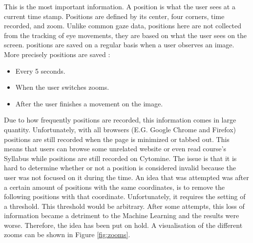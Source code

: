\documentclass[a4paper,11pt]{report}
\numberwithin{figure}{chapter} %
\begin{document}
\begin{itemize}
         This is the most important information.
         A position is what the user sees at a current time stamp.
         Positions are defined by its center, four corners, time recorded, and zoom.
         Unlike common gaze data, positions here are not collected from the tracking of eye movements, they are based on what the user sees on the screen.
         positions are saved on a regular basis when a user observes an image.
         More precisely positions are saved :
         \begin{itemize}
         	\item[\textbullet] Every 5 seconds.
            \item[\textbullet] When the user switches zooms.
            \item[\textbullet] After the user finishes a movement on the image.
         \end{itemize}
         Due to how frequently positions are recorded, this information comes in large quantity.
         Unfortunately, with all browsers (E.G. Google Chrome and Firefox) positions are still recorded when the page is minimized or tabbed out.
         This means that users can browse some unrelated website or even read course's Syllabus while positions are still recorded on Cytomine.
         The issue is that it is hard to determine whether or not a position is considered invalid because the user was not focused on it during the time.
         An idea that was attempted was after a certain amount of positions with the same coordinates, is to remove the following positions with that coordinate.
         Unfortunately, it requires the setting of a threshold.
         This threshold would be arbitrary.
         After some attempts, this loss of information became a detriment to the Machine Learning and the results were worse.
         Therefore, the idea has been put on hold.
         A visualisation of the different zooms can be shown in Figure \ref{fig:zooms}.\\



\end{itemize}
\end{document}
